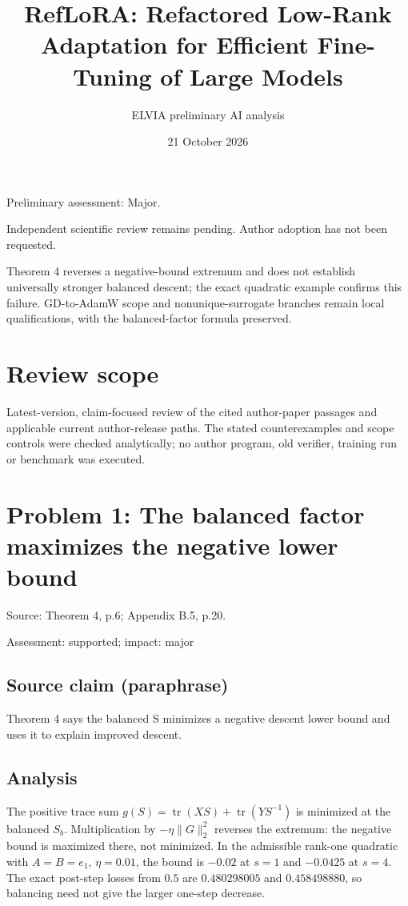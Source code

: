 \documentclass[11pt]{article}
\begin{document}
\title{RefLoRA: Refactored Low-Rank Adaptation for Efficient Fine-Tuning of Large Models}

\author{ELVIA preliminary AI analysis}\date{21 October 2026}\maketitle

Preliminary assessment: Major.\par

Independent scientific review remains pending. Author adoption has not been requested.

Theorem 4 reverses a negative-bound extremum and does not establish universally stronger balanced descent; the exact quadratic example confirms this failure. GD-to-AdamW scope and nonunique-surrogate branches remain local qualifications, with the balanced-factor formula preserved.

\section*{Review scope}

Latest-version, claim-focused review of the cited author-paper passages and applicable current author-release paths. The stated counterexamples and scope controls were checked analytically; no author program, old verifier, training run or benchmark was executed.

\section*{Problem 1: The balanced factor maximizes the negative lower bound}

Source: Theorem 4, p.6; Appendix B.5, p.20.

Assessment: supported; impact: major

\subsection*{Source claim (paraphrase)}

Theorem 4 says the balanced S minimizes a negative descent lower bound and uses it to explain improved descent.

\subsection*{Analysis}

The positive trace sum \(g(S)=\operatorname{tr}(XS)+\operatorname{tr}(YS^{-1})\) is minimized at the balanced \(S_b\). Multiplication by \(-\eta\|G\|_2^2\) reverses the extremum: the negative bound is maximized there, not minimized. In the admissible rank-one quadratic with \(A=B=e_1\), \(\eta=0.01\), the bound is \(-0.02\) at \(s=1\) and \(-0.0425\) at \(s=4\). The exact post-step losses from \(0.5\) are \(0.480298005\) and \(0.458498880\), so balancing need not give the larger one-step decrease.
\end{document}
